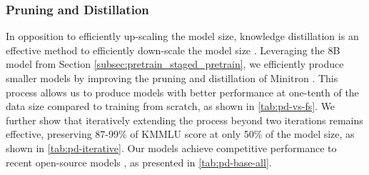 \subsubsection{Pruning and Distillation}
\label{subsec:pretrain_pd}


In opposition to efficiently up-scaling the model size, knowledge distillation is an effective method to efficiently down-scale the model size \citep{hinton2015knowledge-distillation, gunter2024apple, llama3.2}.
Leveraging the 8B model from Section \ref{subsec:pretrain_staged_pretrain}, we efficiently produce smaller models by improving the pruning and distillation of Minitron \citep{muralidharan2024compact, sreenivas2024llm}.
This process allows us to produce models with better performance at one-tenth of the data size compared to training from scratch, as shown in \autoref{tab:pd-vs-fs}.
We further show that iteratively extending the process beyond two iterations remains effective, preserving 87-99\% of KMMLU score at only 50\% of the model size, as shown in \autoref{tab:pd-iterative}.
Our models achieve competitive performance to recent open-source models \citep{allal2025smollm2smolgoesbig, llama3, gemma2024gemma2, qwen25techreport}, as presented in \autoref{tab:pd-base-all}.


\begin{table}[ht]
    \centering
    \caption{
    Token consumption and performance of pruning \& distillation (PD) from preceding models and training from scratch. We use the same 2.1B architecture.
    }
    \label{tab:pd-vs-fs}
\end{table}


